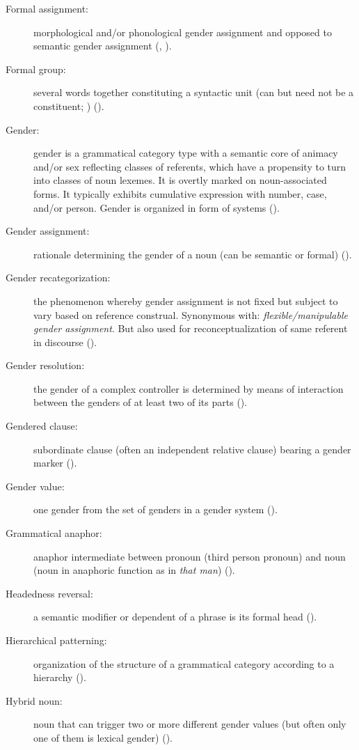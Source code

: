 \documentclass[output=collectionpaper]{langsci/langscibook}
\begin{document}
{\begin{description}
\item  [Formal assignment:] morphological and/or phonological gender assignment and opposed to semantic gender assignment (, ).
\item  [Formal group:] several words together constituting a syntactic unit (can but need not be a constituent; \citealt[190]{Croft2001}) ().
\item  [Gender:] gender is a grammatical category type with a semantic core of animacy and/or sex reflecting classes of referents, which have a propensity to turn into classes of noun lexemes. It is overtly marked on noun-associated forms. It typically exhibits cumulative expression with number, case, and/or person. Gender is organized in form of systems ().
\item  [Gender assignment:] rationale determining the gender of a noun (can be semantic or formal) ().
\item  [Gender recategorization:] the phenomenon whereby gender assignment is not fixed but subject to vary based on reference construal. Synonymous with: \emph{flexible/manipulable gender assignment}. But also used for reconceptualization of same referent in discourse ().
%
\item  [Gender resolution:] the gender of a complex controller is determined by means of interaction between the genders of at least two of its parts ().
\item  [Gendered clause:] subordinate clause (often an independent relative clause) bearing a gender marker ().
\item  [Gender value:] one gender from the set of genders in a gender system ().
\item  [Grammatical anaphor:] anaphor intermediate between pronoun (third person pronoun) and noun (noun in anaphoric function as in \textit{that man}) ().
\item  [Headedness reversal:] a semantic modifier or dependent of a phrase is its formal head ().
\item  [Hierarchical patterning:] organization of the structure of a grammatical category according to a hierarchy ().
\item  [Hybrid noun:] noun that can trigger two or more different gender values (but often only one of them is lexical gender) ().

\end{description}}
\end{document}
